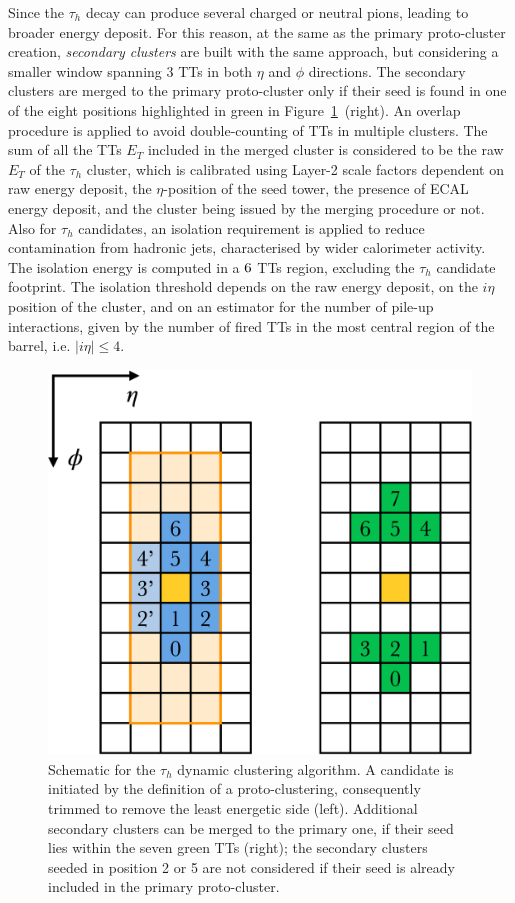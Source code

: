 Since the $\tau_h$ decay can produce several charged or neutral pions, leading to broader energy deposit. 
For this reason, at the same as the primary proto-cluster creation, \textit{secondary clusters} are built with the same approach, but considering a smaller window spanning 3 TTs in both $\eta$ and $\phi$ directions.
The secondary clusters are merged to the primary proto-cluster only if their seed is found in one of the eight positions highlighted in green in Figure~\ref{fig:L1TauCluster}~(right). An overlap procedure is applied to avoid double-counting of TTs in multiple clusters.
The sum of all the TTs $E_T$ included in the merged cluster is considered to be the raw $E_T$ of the $\tau_h$ cluster, which is calibrated using Layer-2 scale factors dependent on raw energy deposit, the $\eta$-position of the seed tower, the presence of ECAL energy deposit, and the cluster being issued by the merging procedure or not.
Also for $\tau_h$ candidates, an isolation requirement is applied to reduce contamination from hadronic jets, characterised by wider calorimeter activity. The isolation energy is computed in a $6\time9$ TTs region, excluding the $\tau_h$ candidate footprint.
The isolation threshold depends on the raw energy deposit, on the $i\eta$ position of the cluster, and on an estimator for the number of pile-up interactions, given by the number of fired TTs in the most central region of the barrel, i.e. $|i\eta|\leq 4$.

\begin{figure}
    \centering
    \includegraphics[width=0.4\linewidth]{Figures/L1TP/L1TauCluster.pdf}
    \caption{Schematic for the $\tau_h$ dynamic clustering algorithm. A candidate is initiated by the definition of a proto-clustering, consequently trimmed to remove the least energetic side (left). Additional secondary clusters can be merged to the primary one, if their seed lies within the seven green TTs (right); the secondary clusters seeded in position 2 or 5 are not considered if their seed is already included in the primary proto-cluster.}
    \label{fig:L1TauCluster}
\end{figure}

